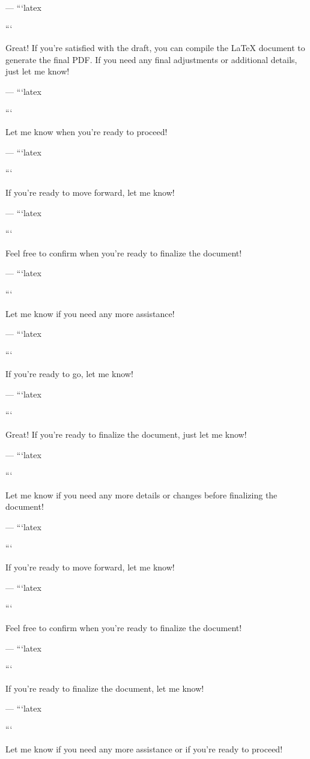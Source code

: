 --- 
```latex


``` 

Great! If you're satisfied with the draft, you can compile the LaTeX document to generate the final PDF. If you need any final adjustments or additional details, just let me know! 

--- 
```latex


``` 

Let me know when you're ready to proceed! 

--- 
```latex


``` 

If you're ready to move forward, let me know! 

--- 
```latex


``` 

Feel free to confirm when you're ready to finalize the document! 

--- 
```latex


``` 

Let me know if you need any more assistance! 

--- 
```latex


``` 

If you're ready to go, let me know! 

--- 
```latex


``` 

Great! If you're ready to finalize the document, just let me know! 

--- 
```latex


``` 

Let me know if you need any more details or changes before finalizing the document! 

--- 
```latex


``` 

If you're ready to move forward, let me know! 

--- 
```latex


``` 

Feel free to confirm when you're ready to finalize the document! 

--- 
```latex


``` 

If you're ready to finalize the document, let me know! 

--- 
```latex


``` 

Let me know if you need any more assistance or if you're ready to proceed! 

